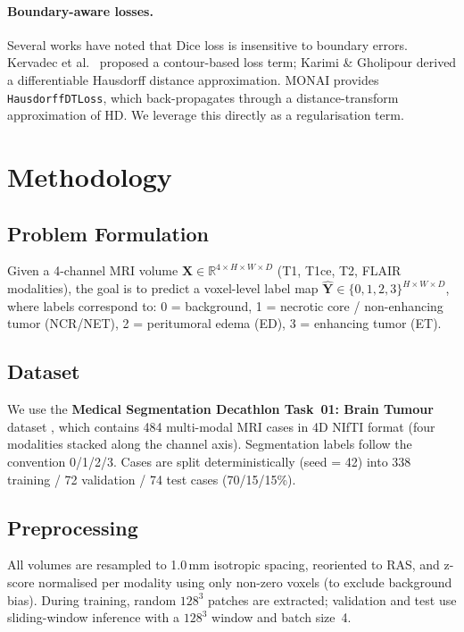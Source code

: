 \documentclass[12pt, letterpaper]{article}
\begin{document}
\paragraph{Boundary-aware losses.}
Several works have noted that Dice loss is insensitive to boundary errors.
Kervadec et al.\ \cite{kervadec2019} proposed a contour-based loss term;
Karimi \& Gholipour \cite{karimi2019} derived a differentiable Hausdorff
distance approximation.
MONAI provides \texttt{HausdorffDTLoss}, which back-propagates through a
distance-transform approximation of HD.
We leverage this directly as a regularisation term.

\section{Methodology}

\subsection{Problem Formulation}
Given a 4-channel MRI volume $\mathbf{X} \in \mathbb{R}^{4 \times H \times W \times D}$
(T1, T1ce, T2, FLAIR modalities), the goal is to predict a voxel-level label map
$\hat{\mathbf{Y}} \in \{0,1,2,3\}^{H \times W \times D}$, where labels correspond
to: 0 = background, 1 = necrotic core / non-enhancing tumor (NCR/NET),
2 = peritumoral edema (ED), 3 = enhancing tumor (ET).

\subsection{Dataset}
We use the \textbf{Medical Segmentation Decathlon Task~01: Brain Tumour} dataset
\cite{antonelli2022}, which contains 484 multi-modal MRI cases in 4D NIfTI
format (four modalities stacked along the channel axis).
Segmentation labels follow the convention 0/1/2/3.
Cases are split deterministically (seed = 42) into
338 training / 72 validation / 74 test cases (70/15/15\%).

\subsection{Preprocessing}
All volumes are resampled to 1.0\,mm isotropic spacing, reoriented to RAS,
and z-score normalised per modality using only non-zero voxels (to exclude
background bias).
During training, random $128^3$ patches are extracted; validation and test
use sliding-window inference with a $128^3$ window and batch size~4.
\end{document}
